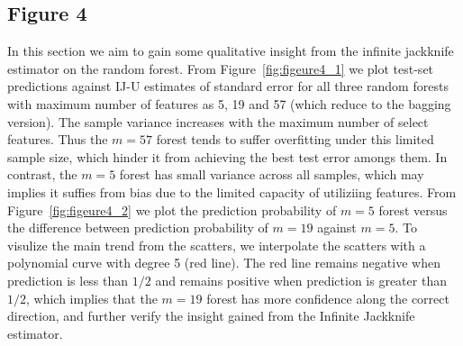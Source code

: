 \documentclass[11pt]{article}
\begin{document}
\subsection{Figure 4}
In this section we aim to gain some qualitative insight from the infinite jackknife estimator on the random forest.
From Figure~\ref{fig:figeure4_1} we plot test-set predictions against IJ-U estimates of standard error for all three random forests with maximum number of features as 5, 19 and 57 (which reduce to the bagging version).
The sample variance increases with the maximum number of select features.
Thus the $m=57$ forest tends to suffer overfitting under this limited sample size, which hinder it from achieving the best test error amongs them.
In contrast, the $m=5$ forest has small variance across all samples, which may implies it suffies from bias due to the limited capacity of utiliziing features.
From Figure~\ref{fig:figeure4_2} we plot the prediction probability of $m=5$ forest versus the difference between prediction probability of $m=19$ against $m=5$.
To visulize the main trend from the scatters, we interpolate the scatters with a polynomial curve with degree 5 (red line).
The red line remains negative when prediction is less than $1/2$ and remains positive when prediction is greater than $1/2$, which implies that the $m=19$ forest has more confidence along the correct direction, and further verify the insight gained from the Infinite Jackknife estimator.
 
\end{document}
